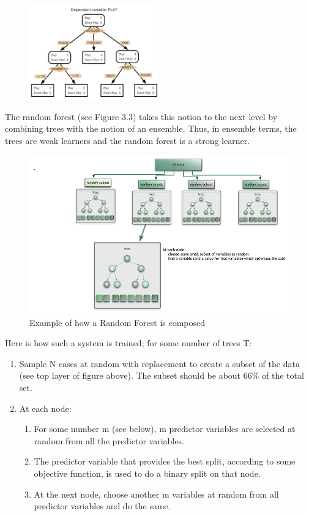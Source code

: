 \begin{figure}
\centering
\includegraphics[width=0.5\textwidth]{img/rf_2.jpg}
\caption{}
\label{}
\end{figure}

The random forest (see Figure 3.3) takes this notion to the next level by combining trees with the notion of an ensemble. Thus, in ensemble terms, the trees are weak learners and the random forest is a strong learner.

\begin{figure}
\centering
    \includegraphics[width=0.7\columnwidth]{img/random_forest_small.jpg}
    \caption{Example of how a Random Forest is composed}
    \label{Fig.4}
\end{figure}

Here is how such a system is trained; for some number of trees T:
\begin{enumerate}
\item Sample N cases at random with replacement to create a subset of the data (see top layer of figure above). The subset should be about 66\% of the total set.
\item At each node:
\begin{enumerate}
\item For some number m (see below), m predictor variables are selected at random from all the
predictor variables.
\item The predictor variable that provides the best split, according to some objective function, is
used to do a binary split on that node.
\item  At the next node, choose another m variables at random from all predictor variables and do
the same.
\end{enumerate}
\end{enumerate}

